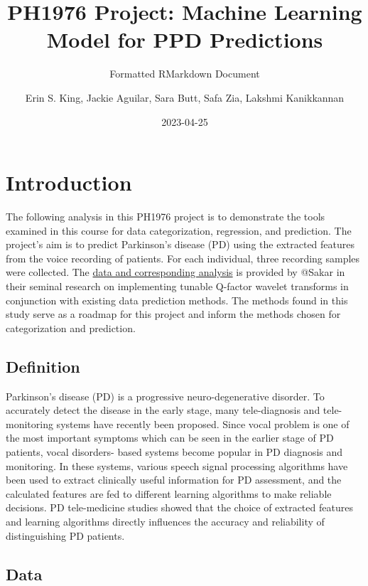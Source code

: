 \documentclass[
]{article}
\title{PH1976 Project: Machine Learning Model for PPD Predictions}
\subtitle{Formatted RMarkdown Document}
\author{Erin S. King,
Jackie Aguilar,
Sara Butt,
Safa Zia,
Lakshmi Kanikkannan}
\date{2023-04-25}
\begin{document}
\maketitle

{
\setcounter{tocdepth}{2}
\tableofcontents
}
\hypertarget{introduction}{%
\section{Introduction}\label{introduction}}

The following analysis in this PH1976 project is to demonstrate the tools examined in this course for data categorization, regression, and prediction. The project's aim is to predict Parkinson's disease (PD) using the extracted features from the voice recording of patients. For each individual, three recording samples were collected. The \href{https://doi.org/10.1016/j.asoc.2018.10.022}{data and corresponding analysis} is provided by @Sakar in their seminal research on implementing tunable Q-factor wavelet transforms in conjunction with existing data prediction methods. The methods found in this study serve as a roadmap for this project and inform the methods chosen for categorization and prediction.

\hypertarget{definition}{%
\subsection{Definition}\label{definition}}

Parkinson's disease (PD) is a progressive neuro-degenerative disorder. To accurately detect the disease in the
early stage, many tele-diagnosis and tele-monitoring systems have recently been proposed. Since vocal problem is one of the most important symptoms which can be seen in the earlier stage of PD patients, vocal disorders-
based systems become popular in PD diagnosis and monitoring. In these systems, various speech signal processing algorithms have been used to extract clinically useful information for PD assessment, and the
calculated features are fed to different learning algorithms to make reliable decisions. PD tele-medicine studies showed that the choice of extracted features and learning algorithms directly influences the accuracy and
reliability of distinguishing PD patients.

\hypertarget{data}{%
\subsection{Data}\label{data}}
\end{document}
